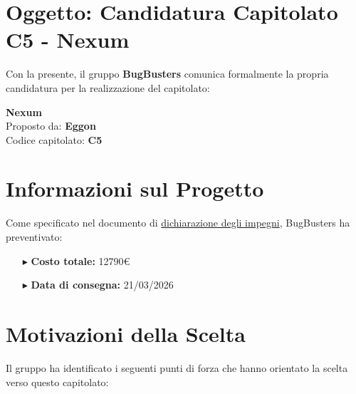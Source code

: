 \documentclass[a4paper,11pt]{article}
\begin{document}
\vspace{2em}

\section*{Oggetto: Candidatura Capitolato C5 - Nexum}

Con la presente, il gruppo \textbf{BugBusters} comunica formalmente la propria candidatura per la realizzazione del capitolato:

\begin{center}
    {\Large\textbf{Nexum}}\\[0.3cm]
    Proposto da: \textbf{Eggon}\\
    Codice capitolato: \textbf{C5}
\end{center}

\vspace{1.5em}

\section*{Informazioni sul Progetto}

Come specificato nel documento di \href{https://bugbustersunipd.github.io/BugBusterSite/assets/docs/DICHIARAZIONE_IMPEGNI/Dichiarazione_impegni.pdf}{dichiarazione degli impegni}, BugBusters ha preventivato:

\begin{itemize}[leftmargin=2cm, itemsep=0.5em]
    \item[\textcolor{primarycolor}{$\blacktriangleright$}] \textbf{Costo totale:} 12790€
    \item[\textcolor{primarycolor}{$\blacktriangleright$}] \textbf{Data di consegna:} 21/03/2026
\end{itemize}

\vspace{1.5em}

\section*{Motivazioni della Scelta}

Il gruppo ha identificato i seguenti punti di forza che hanno orientato la scelta verso questo capitolato:
\end{document}

